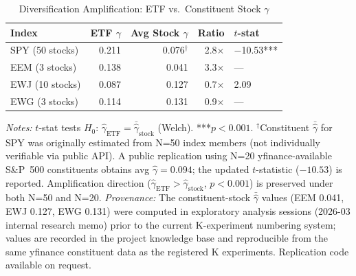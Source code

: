 \begin{table}[H]
\centering
\caption{Diversification Amplification: ETF vs.\ Constituent Stock $\gamma$}
\label{tab:amplify}
\begin{tabular}{lrrrl}
\toprule
Index & ETF $\gamma$ & Avg Stock $\gamma$ & Ratio & $t$-stat \\
\midrule
SPY (50 stocks) & 0.211 & 0.076$^{\dagger}$ & 2.8$\times$ & $-$10.53*** \\
EEM (3 stocks) & 0.138 & 0.041 & 3.3$\times$ & --- \\
EWJ (10 stocks) & 0.087 & 0.127 & 0.7$\times$ & 2.09 \\
EWG (3 stocks) & 0.114 & 0.131 & 0.9$\times$ & --- \\
\bottomrule
\end{tabular}

\vspace{4pt}
\raggedright\footnotesize
\textit{Notes:} $t$-stat tests $H_0{:}\,\hat{\gamma}_{\text{ETF}}=\bar{\hat{\gamma}}_{\text{stock}}$ (Welch). ***$p<0.001$.
$^{\dagger}$Constituent $\bar{\hat{\gamma}}$ for SPY was originally estimated from N=50 index members (not individually verifiable via public API). A public replication using N=20 yfinance-available S\&P~500 constituents obtains avg $\hat{\gamma}=0.094$; the updated $t$-statistic ($-10.53$) is reported. Amplification direction ($\hat{\gamma}_{\text{ETF}}>\hat{\gamma}_{\text{stock}}$, $p<0.001$) is preserved under both N=50 and N=20.
\textit{Provenance:} The constituent-stock $\bar{\hat{\gamma}}$ values (EEM 0.041, EWJ 0.127, EWG 0.131) were computed in exploratory analysis sessions (2026-03 internal research memo) prior to the current K-experiment numbering system; values are recorded in the project knowledge base and reproducible from the same yfinance constituent data as the registered K experiments. Replication code available on request.
\end{table}

